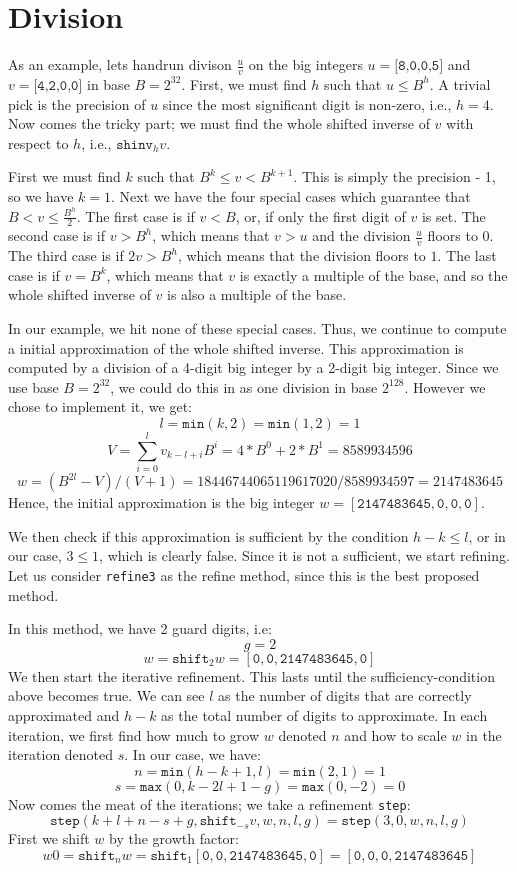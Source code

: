 \section{Division}
\label{sec:div}
As an example, lets handrun divison $\frac{u}{v}$ on the big integers $u = \texttt{[8,0,0,5]}$ and $v = \texttt{[4,2,0,0]}$ in base $B=2^{32}$. First, we must find $h$ such that $u\leq B^h$. A trivial pick is the precision of $u$ since the most significant digit is non-zero, i.e., $h=4$. Now comes the tricky part; we must find the whole shifted inverse of $v$ with respect to $h$, i.e., $\mathtt{shinv}_hv$.

First we must find $k$ such that $B^k\leq v < B^{k+1}$. This is simply the precision - 1, so we have $k = 1$. Next we have the four special cases which guarantee that $B < v \leq \frac{B^h}{2}$. The first case is if $v < B$, or, if only the first digit of $v$ is set. The second case is if $v > B^h$, which means that $v>u$ and the division $\frac{u}{v}$ floors to $0$. The third case is if $2v > B^h$, which means that the division floors to $1$. The last case is if $v = B^k$, which means that $v$ is exactly a multiple of the base, and so the whole shifted inverse of $v$ is also a multiple of the base.

In our example, we hit none of these special cases. Thus, we continue to compute a initial approximation of the whole shifted inverse. This approximation is computed by a division of a 4-digit big integer by a 2-digit big integer. Since we use base $B = 2^{32}$, we could do this in as one division in base $2^{128}$. However we chose to implement it, we get:
\[l = \mathtt{min}(k,2) = \mathtt{min}(1,2) = 1\]
\[V = \sum_{i=0}^lv_{k-l+i}B^i = 4 * B^0 + 2 * B^{1} = 8589934596\]
\[w = (B^{2l}- V ) / (V + 1) = 18446744065119617020 / 8589934597 = 2147483645\]
Hence, the initial approximation is the big integer $w = \mathtt{[2147483645,0,0,0]}$.

We then check if this approximation is sufficient by the condition $h-k \leq l$, or in our case, $3 \leq 1$, which is clearly false. Since it is not a sufficient, we start refining. Let us consider \texttt{refine3} as the refine method, since this is the best proposed method.

In this method, we have 2 guard digits, i.e:
\[g = 2\]
\[w = \mathtt{shift}_2w = \mathtt{[0,0,2147483645,0]}\]
We then start the iterative refinement. This lasts until the sufficiency-condition above becomes true. We can see $l$ as the number of digits that are correctly approximated and $h - k$ as the total number of digits to approximate. In each iteration, we first find how much to grow $w$ denoted $n$ and how to scale $w$ in the iteration denoted $s$. In our case, we have:
\[n = \mathtt{min}(h-k+1, l) = \mathtt{min}(2, 1) = 1\]
\[s = \mathtt{max}(0, k - 2l + 1 - g) = \mathtt{max}(0,-2) = 0\]
Now comes the meat of the iterations; we take a refinement \texttt{step}:
\[ \mathtt{step}(k + l + n - s + g, \mathtt{shift}_{-s}v, w, n, l, g) = \mathtt{step}(3, 0, w, n, l, g)\]
First we shift $w$ by the growth factor:
\[w0 = \mathtt{shift}_nw = \mathtt{shift}_1 \mathtt{[0,0,2147483645,0]}= \mathtt{[0,0,0,2147483645]}\]

